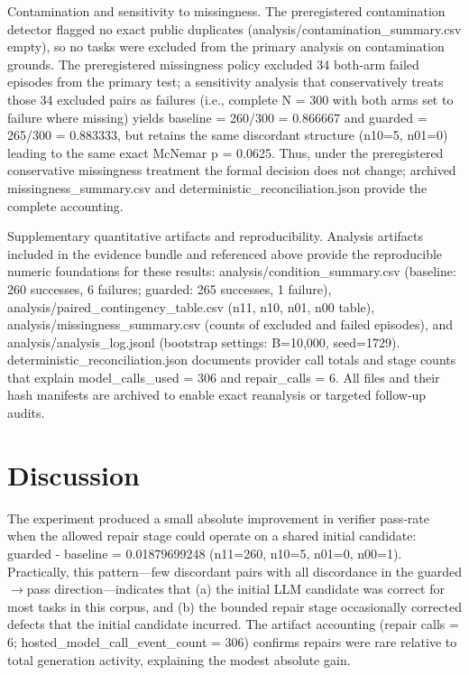 \documentclass[conference]{IEEEtran}
\begin{document}
Contamination and sensitivity to missingness. The preregistered contamination detector flagged no exact public duplicates (analysis/contamination\_summary.csv empty), so no tasks were excluded from the primary analysis on contamination grounds. The preregistered missingness policy excluded 34 both‑arm failed episodes from the primary test; a sensitivity analysis that conservatively treats those 34 excluded pairs as failures (i.e., complete N = 300 with both arms set to failure where missing) yields baseline = 260/300 = 0.866667 and guarded = 265/300 = 0.883333, but retains the same discordant structure (n10=5, n01=0) leading to the same exact McNemar p = 0.0625. Thus, under the preregistered conservative missingness treatment the formal decision does not change; archived missingness\_summary.csv and deterministic\_reconciliation.json provide the complete accounting.

Supplementary quantitative artifacts and reproducibility. Analysis artifacts included in the evidence bundle and referenced above provide the reproducible numeric foundations for these results: analysis/condition\_summary.csv (baseline: 260 successes, 6 failures; guarded: 265 successes, 1 failure), analysis/paired\_contingency\_table.csv (n11, n10, n01, n00 table), analysis/missingness\_summary.csv (counts of excluded and failed episodes), and analysis/analysis\_log.jsonl (bootstrap settings: B=10,000, seed=1729). deterministic\_reconciliation.json documents provider call totals and stage counts that explain model\_calls\_used = 306 and repair\_calls = 6. All files and their hash manifests are archived to enable exact reanalysis or targeted follow‑up audits.

\section{Discussion}
The experiment produced a small absolute improvement in verifier pass‑rate when the allowed repair stage could operate on a shared initial candidate: guarded - baseline = 0.01879699248 (n11=260, n10=5, n01=0, n00=1). Practically, this pattern---few discordant pairs with all discordance in the guarded\ensuremath{\rightarrow}pass direction---indicates that (a) the initial LLM candidate was correct for most tasks in this corpus, and (b) the bounded repair stage occasionally corrected defects that the initial candidate incurred. The artifact accounting (repair calls = 6; hosted\_model\_call\_event\_count = 306) confirms repairs were rare relative to total generation activity, explaining the modest absolute gain.
\end{document}
